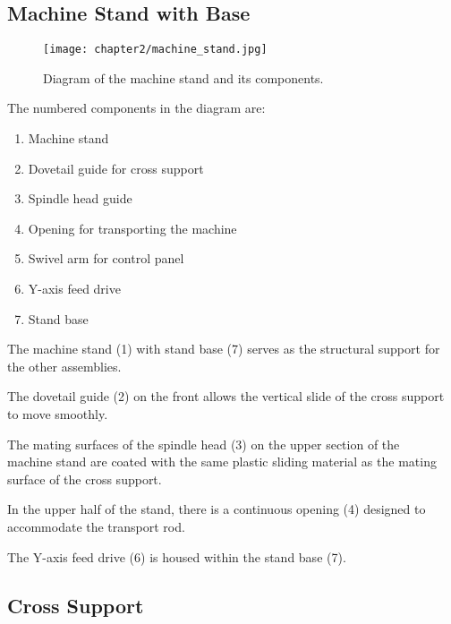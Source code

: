 
\subsection{Machine Stand with Base}

\begin{figure}[h]
    \centering
    \texttt{[image: chapter2/machine\_stand.jpg]}
    \caption{Diagram of the machine stand and its components.}
    \label{fig:machine_stand}
\end{figure}

The numbered components in the diagram are:
\begin{enumerate}[itemsep=1pt,parsep=0pt]
    \item Machine stand
    \item Dovetail guide for cross support
    \item Spindle head guide
    \item Opening for transporting the machine
    \item Swivel arm for control panel
    \item Y-axis feed drive
    \item Stand base
\end{enumerate}

The machine stand (1) with stand base (7) serves as the structural support for the other assemblies.

The dovetail guide (2) on the front allows the vertical slide of the cross support to move smoothly.

The mating surfaces of the spindle head (3) on the upper section of the \\machine stand are coated with the same plastic sliding material as the mating surface of the cross support.

In the upper half of the stand, there is a continuous opening (4) designed to accommodate the transport rod.

The Y-axis feed drive (6) is housed within the stand base (7).

\vfill
\clearpage

\subsection{Cross Support}

